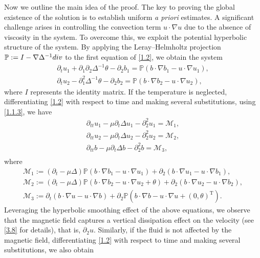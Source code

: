 \documentclass[10pt,a4paper]{amsart}
\numberwithin{equation}{section}
\begin{document}
Now we outline the main idea of the proof. The key to proving the global existence of the solution is to
establish uniform \emph{a priori} estimates. A significant challenge arises in controlling the convection
term $u\cdot\nabla u$ due to the absence of viscosity in the system. To overcome this, we exploit the
potential hyperbolic structure of the system. By applying the Leray--Helmholtz projection
$\mathbb{P}:=I-\nabla\Delta^{-1}{\rm div}$ to the first equation of \eqref{1.2}, we obtain the system
\begin{equation} \label{1.1.3}
\begin{gathered}
\partial_tu_1+\partial_1\partial_2\Delta^{-1}\theta-\partial_2b_1=\mathbb{P}(b\cdot\nabla b_1-u\cdot\nabla u_1),\\
\partial_tu_2-\partial_1^2\Delta^{-1}\theta-\partial_2b_2=\mathbb{P}(b\cdot\nabla b_2-u\cdot\nabla u_2),
\end{gathered}
\end{equation}
where $I$ represents the identity matrix.
If the temperature is neglected, differentiating \eqref{1.2} with respect to time and making several substitutions, using \eqref{1.1.3}, we have
\begin{equation} \label{1.7}
\begin{gathered}
\partial_{tt}u_1-\mu\partial_t\Delta u_1-\partial_2^2u_1=\mathcal{M}_1,\\
\partial_{tt}u_2-\mu\partial_t\Delta u_2-\partial_2^2u_2=\mathcal{M}_2,\\
\partial_{tt}b-\mu\partial_t\Delta b-\partial_2^2b=\mathcal{M}_3,\\
\end{gathered}
\end{equation}
where
\begin{gather*}
\mathcal{M}_1:=(\partial_t-\mu\Delta)\mathbb{P}(b\cdot\nabla b_1-u\cdot\nabla u_1)+\partial_2(b\cdot\nabla u_1-u\cdot\nabla b_1),\\
\mathcal{M}_2:=(\partial_t-\mu\Delta)\mathbb{P}(b\cdot\nabla b_2-u\cdot\nabla u_2+\theta)+\partial_2(b\cdot\nabla u_2-u\cdot\nabla b_2),\\
\mathcal{M}_3:=\partial_t(b\cdot\nabla u-u\cdot\nabla b)+\partial_2\mathbb{P}(b\cdot\nabla b-u\cdot\nabla u+(0,\theta)^\mathrm{T}).
\end{gather*}
Leveraging the hyperbolic smoothing effect of the above equations, we observe that the magnetic
field captures a vertical dissipation effect on the velocity (see \eqref{3.8} for details), that is,
$\partial_2u$. Similarly, if the fluid is not affected by the magnetic field, differentiating \eqref{1.2} with respect to time and making several substitutions, we also obtain
\end{document}
